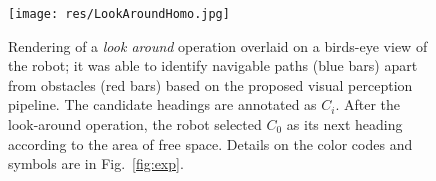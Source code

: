 \begin{figure}
    \centering
    \texttt{[image: res/LookAroundHomo.jpg]}%
    \vspace{-1mm}
    \caption{Rendering of a \textit{look around} operation overlaid on a birds-eye view of the robot; it was able to identify navigable paths (blue bars) apart from obstacles (red bars) based on the proposed visual perception pipeline. The candidate headings are annotated as $C_i$. After the look-around operation, the robot selected $C_0$ as its next heading according to the area of free space. Details on the color codes and symbols are in Fig.~\ref{fig:exp}.
    }
    \vspace{-1mm}
    \label{fig:visual-homo}
\end{figure}


